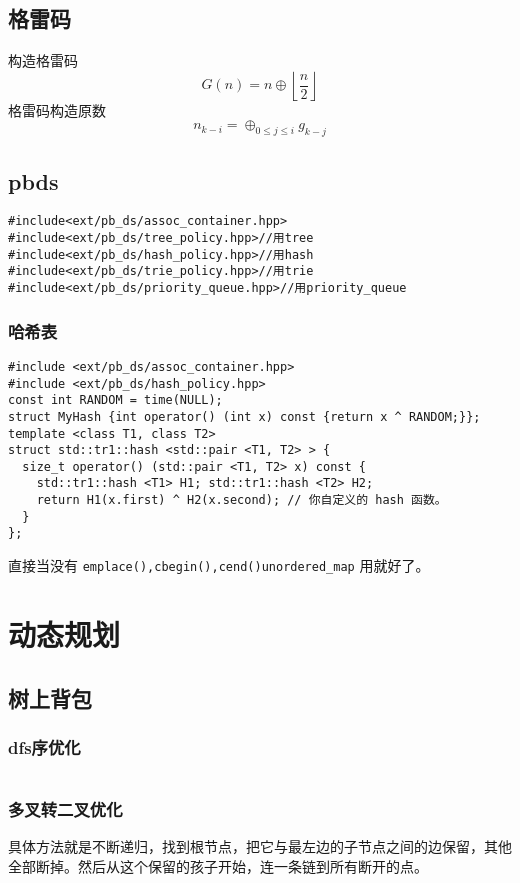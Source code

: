 \documentclass[a4paper]{report}
\newcommand{\cppcode}[1]{  
    \inputminted[mathescape]{cpp}{source/#1}  
}
\begin{document}
\section{格雷码}
构造格雷码\\
$$
G(n)=n\oplus \left\lfloor\frac{n}{2}\right\rfloor
$$
格雷码构造原数\\
$$
n_{k-i}=\oplus_{0\le j \le i} g_{k-j}
$$

\section{pbds}
\begin{verbatim}  
#include<ext/pb_ds/assoc_container.hpp>
#include<ext/pb_ds/tree_policy.hpp>//用tree
#include<ext/pb_ds/hash_policy.hpp>//用hash
#include<ext/pb_ds/trie_policy.hpp>//用trie
#include<ext/pb_ds/priority_queue.hpp>//用priority_queue    
\end{verbatim}  

\subsection{哈希表}
\begin{verbatim}
#include <ext/pb_ds/assoc_container.hpp>
#include <ext/pb_ds/hash_policy.hpp>
const int RANDOM = time(NULL);
struct MyHash {int operator() (int x) const {return x ^ RANDOM;}};
template <class T1, class T2>
struct std::tr1::hash <std::pair <T1, T2> > {
  size_t operator() (std::pair <T1, T2> x) const {
    std::tr1::hash <T1> H1; std::tr1::hash <T2> H2;
    return H1(x.first) ^ H2(x.second); // 你自定义的 hash 函数。
  }
};
\end{verbatim}
直接当没有 \texttt{emplace(),cbegin(),cend()}\texttt{unordered\_map} 用就好了。\\


\chapter{动态规划}
\section{树上背包}
\subsection{dfs序优化}
\cppcode{树上背包dfs.cpp}

\subsection{多叉转二叉优化}
具体方法就是不断递归，找到根节点，把它与最左边的子节点之间的边保留，其他全部断掉。然后从这个保留的孩子开始，连一条链到所有断开的点。\\
\cppcode{树上背包转二叉.cpp}
\end{document}
